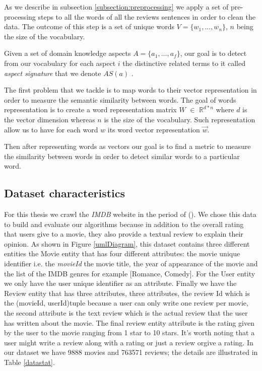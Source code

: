 \documentclass{article}
\begin{document}
As we describe in subsection \ref{subsection:preprocessing} we apply a set of pre-processing steps to all the words of all the reviews sentences in order to clean the data. The outcome of this step is a set of unique words $V= \{w_{1},..., w_{n} \}$, $n$ being the size of the vocabulary. 

Given a set of domain knowledge aspects $A = \{a_{1},..., a_{f} \}$, our goal is to detect from our vocabulary for each aspect $i$ the distinctive related terms to it called \textit{aspect signature} that we denote $AS(a)$ .

The first problem that we tackle is to map words to their vector representation in order to measure the semantic similarity between words.
The goal of words representation is to create a word representation matrix  $W$ $\in$  $\mathbb{R}^{d*n} $ where $d$ is the vector dimension whereas $n$ is the size of the vocabulary.
Such representation allow us to have for each word $w$ its word vector representation $\vec{w}$.

Then after representing words as vectors our goal is to find a metric to measure the similarity between words in order to detect similar words to a particular word.

\subsection{Dataset characteristics}
For this thesis we crawl the \textit{IMDB} website in the period of (). We chose this data to build and evaluate our algorithms because in addition to the overall rating that users give to a movie, they also provide a textual review to explain their opinion. As shown in Figure \ref{umlDiagram}, this dataset contains three different entities the Movie entity that has four different attributes: the movie unique identifier i.e. the \textit{movieId} the movie title, the year of appearance of the movie  and the list of the IMDB genres for example [Romance, Comedy]. For the User entity we only have the user unique identifier as an attribute. Finally we have the Review entity that has three attributes, three attributes, the review Id which is the (movieId, userId)tuple because a user can only write one review per movie, the second attribute is the text review which is the actual review that the user has written about the movie. The final review entity attribute is the rating given by the user to the movie ranging from 1 star to 10 stars. It's worth noting that a user might write a review along with a rating or just a review orgive a rating. In our dataset we have 9888 movies  and 763571 reviews; the details are illustrated in Table \ref{datastat}.
\end{document}
